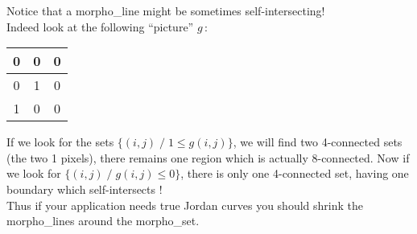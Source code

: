 \medskip
Notice that a morpho\_line might be sometimes self-intersecting!\\
 Indeed look at the following ``picture'' $g$\,: 
\begin{tabular}{|c|c|c|}  \hline
0 & 0 & 0 \\ \hline
0 & 1 & 0 \\ \hline
1 & 0 & 0 \\ \hline
\end{tabular}

If we look for the sets $\{(i,j) \;/\; 1\leq g(i,j) \}$, we will
find two 4-connected sets (the two 1 pixels), 
there remains one region which is actually 8-connected. 
Now if we look for $\{(i,j) \;/\; g(i,j)\leq 0 \}$,
there is only one 4-connected set, having one boundary which
self-intersects ! \\
Thus if your application needs true Jordan curves
you should shrink the morpho\_lines around the morpho\_set.